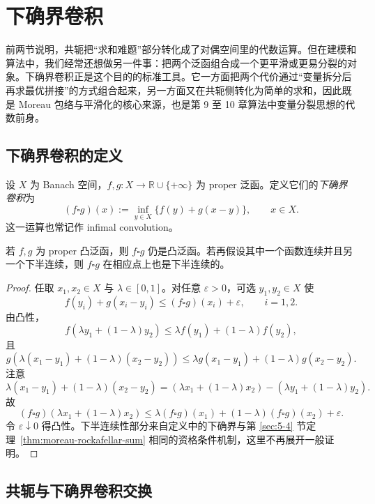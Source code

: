 \section{下确界卷积}

\label{sec:6-3}

前两节说明，共轭把“求和难题”部分转化成了对偶空间里的代数运算。但在建模和算法中，我们经常还想做另一件事：把两个泛函组合成一个更平滑或更易分裂的对象。下确界卷积正是这个目的的标准工具。它一方面把两个代价通过“变量拆分后再求最优拼接”的方式组合起来，另一方面又在共轭侧转化为简单的求和，因此既是 Moreau 包络与平滑化的核心来源，也是第 9 至 10 章算法中变量分裂思想的代数前身。

\subsection{下确界卷积的定义}

\begin{definition}[下确界卷积]\label{def:infimal-convolution}
设 $X$ 为 Banach 空间，$f,g\colon X\to \mathbb R\cup\{+\infty\}$ 为 proper 泛函。定义它们的\emph{下确界卷积}为
\[
(f\square g)(x):=\inf_{y\in X}\{f(y)+g(x-y)\},\qquad x\in X.
\]
这一运算也常记作 infimal convolution。
\end{definition}

\begin{proposition}[下确界卷积保持凸性]\label{prop:infimal-convolution-convexity}
若 $f,g$ 为 proper 凸泛函，则 $f\square g$ 仍是凸泛函。若再假设其中一个函数连续并且另一个下半连续，则 $f\square g$ 在相应点上也是下半连续的。
\end{proposition}

\begin{proof}
任取 $x_1,x_2\in X$ 与 $\lambda\in[0,1]$。对任意 $\varepsilon>0$，可选 $y_1,y_2\in X$ 使
\[
f(y_i)+g(x_i-y_i)\le (f\square g)(x_i)+\varepsilon,\qquad i=1,2.
\]
由凸性，
\[
f(\lambda y_1+(1-\lambda)y_2)\le \lambda f(y_1)+(1-\lambda)f(y_2),
\]
且
\[
g(\lambda(x_1-y_1)+(1-\lambda)(x_2-y_2))
\le
\lambda g(x_1-y_1)+(1-\lambda)g(x_2-y_2).
\]
注意
\[
\lambda(x_1-y_1)+(1-\lambda)(x_2-y_2)
=
(\lambda x_1+(1-\lambda)x_2)-(\lambda y_1+(1-\lambda)y_2).
\]
故
\[
(f\square g)(\lambda x_1+(1-\lambda)x_2)
\le
\lambda(f\square g)(x_1)+(1-\lambda)(f\square g)(x_2)+\varepsilon.
\]
令 $\varepsilon\downarrow 0$ 得凸性。下半连续性部分来自定义中的下确界与第 \ref{sec:5-4} 节定理~\ref{thm:moreau-rockafellar-sum} 相同的资格条件机制，这里不再展开一般证明。
\end{proof}

\subsection{共轭与下确界卷积交换}

